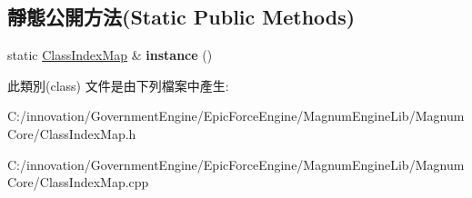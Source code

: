 \subsection*{靜態公開方法(Static Public Methods)}
\begin{DoxyCompactItemize}
\item 
static \hyperlink{class_i_dream_sky_1_1_class_index_map}{Class\+Index\+Map} \& {\bfseries instance} ()\hypertarget{class_i_dream_sky_1_1_class_index_map_a4b4fca66f4b175decbe3dbf4dc3715b5}{}\label{class_i_dream_sky_1_1_class_index_map_a4b4fca66f4b175decbe3dbf4dc3715b5}

\end{DoxyCompactItemize}


此類別(class) 文件是由下列檔案中產生\+:\begin{DoxyCompactItemize}
\item 
C\+:/innovation/\+Government\+Engine/\+Epic\+Force\+Engine/\+Magnum\+Engine\+Lib/\+Magnum\+Core/Class\+Index\+Map.\+h\item 
C\+:/innovation/\+Government\+Engine/\+Epic\+Force\+Engine/\+Magnum\+Engine\+Lib/\+Magnum\+Core/Class\+Index\+Map.\+cpp\end{DoxyCompactItemize}
